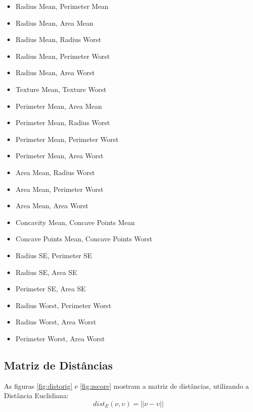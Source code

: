 \documentclass[11pt,a4paper]{article}
\numberwithin{equation}{section}
\begin{document}
\begin{multicols}{2}
\begin{itemize}
	 \item Radius Mean, Perimeter Mean
	 \item Radius Mean, Area Mean
	 \item Radius Mean, Radius Worst
	 \item Radius Mean, Perimeter Worst
	 \item Radius Mean, Area Worst
	 \item Texture Mean, Texture Worst
	 \item Perimeter Mean, Area Mean
	 \item Perimeter Mean, Radius Worst
	 \item Perimeter Mean, Perimeter Worst
	 \item Perimeter Mean, Area Worst
	 \item Area Mean, Radius Worst
	 \item Area Mean, Perimeter Worst
	 \item Area Mean, Area Worst
	 \item Concavity Mean, Concave Points Mean
	 \item Concave Points Mean, Concave Points Worst
	 \item Radius SE, Perimeter SE
	 \item Radius SE, Area SE
	 \item Perimeter SE, Area SE
 	 \item Radius Worst, Perimeter Worst
	 \item Radius Worst, Area Worst
	 \item Perimeter Worst, Area Worst
\end{itemize}
\end{multicols}

\subsection{Matriz de Distâncias} 

As figuras \ref{fig:distorig} e \ref{fig:zscore} mostram a matriz de distâncias, utilizando a Distância Euclidiana:
\[dist_E(\nu,\upsilon) = ||\nu-\upsilon||\]
\end{document}
